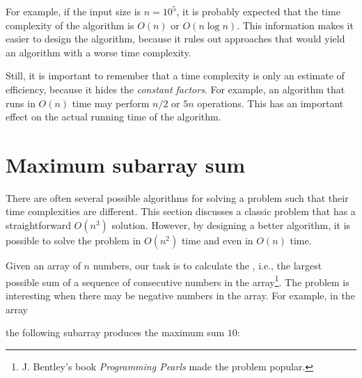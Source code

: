 For example, if the input size is $n=10^5$,
it is probably expected that the time
complexity of the algorithm is $O(n)$ or $O(n \log n)$.
This information makes it easier to design the algorithm,
because it rules out approaches that would yield
an algorithm with a worse time complexity.


Still, it is important to remember that a
time complexity is only an estimate of efficiency,
because it hides the \emph{constant factors}.
For example, an algorithm that runs in $O(n)$ time
may perform $n/2$ or $5n$ operations.
This has an important effect on the actual
running time of the algorithm.

\section{Maximum subarray sum}


There are often several possible algorithms
for solving a problem such that their
time complexities are different.
This section discusses a classic problem that
has a straightforward $O(n^3)$ solution.
However, by designing a better algorithm, it
is possible to solve the problem in $O(n^2)$
time and even in $O(n)$ time.

Given an array of $n$ numbers,
our task is to calculate the
, i.e.,
the largest possible sum of 
a sequence of consecutive numbers
in the array\footnote{J. Bentley's
book \emph{Programming Pearls} \cite{ben86} made the problem popular.}.
The problem is interesting when there may be
negative numbers in the array.
For example, in the array
\begin{center}
\end{center}
\begin{samepage}
the following subarray produces the maximum sum $10$:
\begin{center}
\end{center}
\end{samepage}

